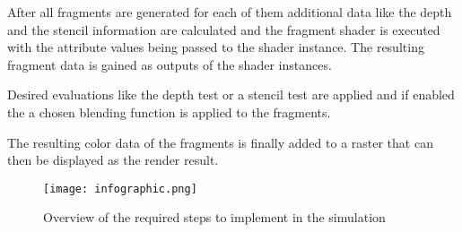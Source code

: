 After all fragments are generated for each of them additional data like the depth and the stencil information are calculated and the fragment shader is executed with the attribute values being passed to the shader instance. The resulting fragment data is gained as outputs of the shader instances.

Desired evaluations like the depth test or a stencil test are applied and if enabled the a chosen blending function is applied to the fragments.

The resulting color data of the fragments is finally added to a raster that can then be displayed as the render result.

\begin{figure}[h!]
  \centering 
  \texttt{[image: infographic.png]}
  \caption{Overview of the required steps to implement in the simulation}
  \label{fig:infographic}
\end{figure}


